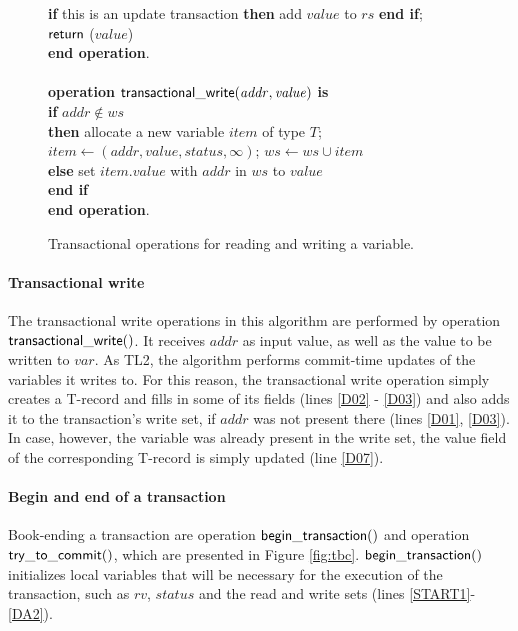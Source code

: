 \documentclass[11pt,letterpaper]{article}
\begin{document}
\begin{figure}
{{\begin{minipage}[t]{150mm}
\begin{tabbing}
 \> {\bf if} this is an update transaction 
                        {\bf then} add $\mathit{value}$ to $\mathit{rs}$ {\bf end if}; \\
 \> ${\sf return}$ ($\mathit{value}$) \\
{\bf end operation}. \\
\\
{\bf operation}  ${\sf transactional\_write}(\mathit{addr, value})$ {\bf is}\\
 \> {\bf if} $\mathit{addr} \not\in \mathit{ws}$  \\
 \>\> {\bf then} \> allocate a new variable $item$ of type $T$; \\
 \>\>\> $\mathit{item}  \gets (\mathit{addr, value, status, \infty})$; 
                   $\mathit{ws} \gets \mathit{ws} \cup \mathit{item}$ \\
 \>\> {\bf else} \> set $\mathit{item.value}$ with $\mathit{addr}$ in $\mathit{ws}$ to $\mathit{value}$ \\
 \> {\bf end if} \\
{\bf end operation}.
\end{tabbing}
\normalsize
\end{minipage}
}
\caption{Transactional operations for reading and writing a variable.}
\label{fig:tops}
}
\end{figure}

\paragraph{Transactional write}
The transactional write operations in this algorithm are performed by 
operation ${\sf transactional\_write()}$. 
It receives $\mathit{addr}$ as input value, as well as the value 
to be written to $\mathit{var}$. As  TL2, the algorithm 
performs commit-time updates of the variables it writes to. 
For this reason, the transactional write  
operation simply creates a T-record and fills in some of its 
fields (lines \ref{D02} - \ref{D03}) and also 
adds it to the transaction{}'s write set, 
if $\mathit{addr}$ was not present there (lines \ref{D01}, \ref{D03}). 
In case,  however,  the variable was already present in  the write set, the
{\sf value} field of the corresponding  
T-record is simply updated (line \ref{D07}).



\paragraph{Begin and end of a transaction} 
Book-ending a transaction are operation ${\sf begin\_transaction()}$ 
and operation ${\sf try\_to\_commit()}$, which are 
presented in Figure \ref{fig:tbc}. ${\sf begin\_transaction()}$ 
initializes local variables that will be necessary 
for the execution of the transaction, such as $\mathit{rv}$, 
$\mathit{status}$ and the read and write sets 
(lines \ref{START1}-\ref{DA2}). 
\end{document}
